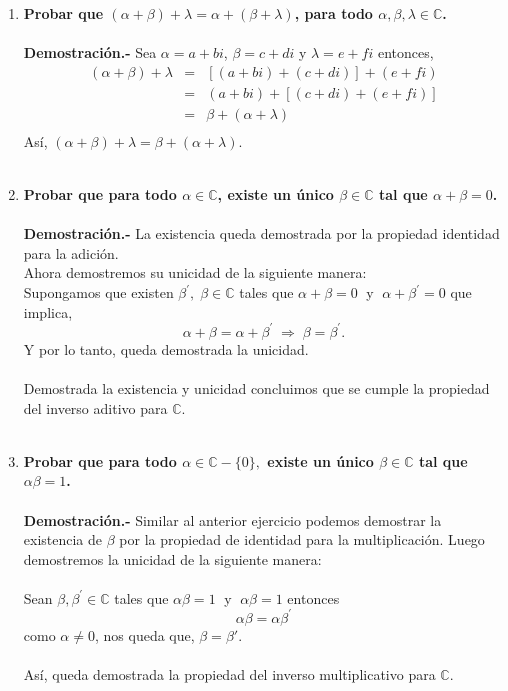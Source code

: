 \begin{multicols}{2}
\begin{enumerate}
    \item \textbf{\boldmath Probar que $(\alpha+\beta)+\lambda = \alpha + (\beta + \lambda)$, para todo $\alpha,\beta,\lambda \in \mathbb{C}$.}\\\\
	\textbf{Demostración.-}\; Sea $\alpha = a+bi$,  $\beta = c+di$ y $\lambda = e + fi$ entonces,
	$$\begin{array}{rcl}
	    (\alpha + \beta) + \lambda &=&\left[(a+bi)+(c+di)\right]+(e+fi)\\
				       &=&(a+bi)+\left[(c+di)+(e+fi)\right]\\
				       &=&\beta + (\alpha + \lambda)\\
	\end{array}$$
	Así, $(\alpha + \beta) + \lambda = \beta + (\alpha + \lambda).$\\\\


    \item \textbf{\boldmath Probar que para todo $\alpha \in \mathbb{C}$, existe un único $\beta \in \mathbb{C}$ tal que $\alpha + \beta = 0$.}\\\\
	\textbf{Demostración.-}\; La existencia queda demostrada por la propiedad identidad para la adición.\\
	Ahora demostremos su unicidad de la siguiente manera:\\
	Supongamos que existen  $\beta^{'},\; \beta \in \mathbb{C}$ tales que $\alpha + \beta = 0\;$ y $\;\alpha + \beta^{'} = 0$ que implica,
	$$\alpha + \beta = \alpha + \beta^{'} \; \Longrightarrow \;\beta=\beta^{'}.$$
	Y por lo tanto, queda demostrada la unicidad.\\\\
	Demostrada la existencia y unicidad concluimos que se cumple la propiedad del inverso aditivo para $\mathbb{C}$.\\\\
	

    \item \textbf{ \boldmath Probar que para todo $\alpha \in \mathbb{C}-\lbrace0 \rbrace,$ existe un único $\beta \in \mathbb{C}$ tal que $\alpha \beta = 1$.}\\\\
	\textbf{Demostración.-}\; Similar al anterior ejercicio podemos demostrar la existencia de $\beta$ por la propiedad de identidad para la multiplicación. Luego demostremos la unicidad de la siguiente manera:\\\\
	Sean $\beta, \beta^{'}\in \mathbb{C}$ tales que $\alpha \beta = 1\; $ y $\; \alpha \beta = 1$  entonces $$\alpha\beta = \alpha \beta^{'}$$
	 como $\alpha\neq 0$, nos queda que, $\beta=\beta{'}$.\\\\ 
	 Así, queda demostrada la propiedad del inverso multiplicativo para $\mathbb{C}$.\\\\


\end{enumerate}
\end{multicols}
